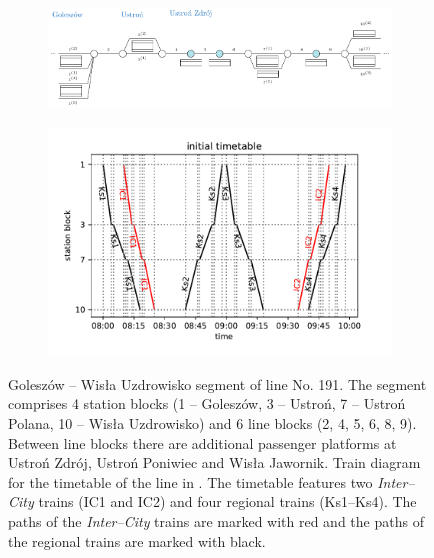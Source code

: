 \begin{figure}
  \begin{subfigure}{\textwidth}
    \caption{}\label{fig:linelarge:line}
    \includegraphics[width=\textwidth]{figures/line.pdf}
  \end{subfigure}
  \begin{subfigure}{\textwidth}
    \caption{}\label{fig:linelarge:diagram}
    \includegraphics[width=\textwidth]{figures/train_diagram}
  \end{subfigure}
  \caption{ Goleszów -- Wisła Uzdrowisko segment of line No. 191. The segment comprises 4
    station blocks (1 -- Goleszów, 3 -- Ustroń, 7 -- Ustroń Polana, 10 -- Wisła
    Uzdrowisko) and 6 line blocks (2, 4, 5, 6, 8, 9). Between line blocks there are
    additional passenger platforms at Ustroń Zdrój, Ustroń Poniwiec and Wisła
    Jawornik.  Train diagram for the timetable of the line in .
    The timetable features two \emph{Inter--City} trains (IC1 and IC2) and four regional trains (Ks1--Ks4).
    The paths of the \emph{Inter--City} trains are marked with red and the paths of the regional trains are
    marked with black.}
  \label{fig:linelarge}
\end{figure}


